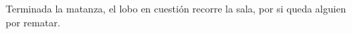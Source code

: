 %
%
%
%

Terminada la matanza, el lobo en cuestión recorre la sala, por si queda alguien por rematar.

